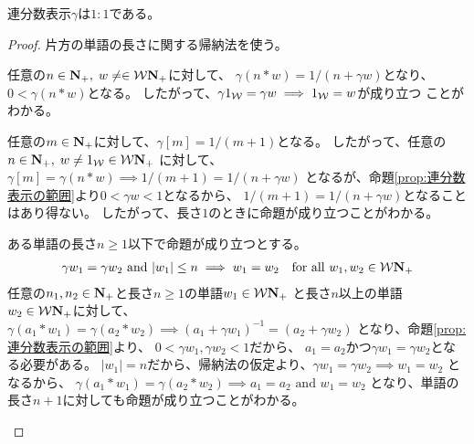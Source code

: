 	\begin{proposition}[連分数表示は1:1]\label{prop:連分数表示は1:1} %
		連分数表示$\gamma$は$1:1$である。
	\end{proposition} %
	\begin{proof} 片方の単語の長さに関する帰納法を使う。
	\begin{description}\setlength{\itemsep}{-1mm} %
		\item[長さ$0$] 任意の$n\in\mathbf{N}_+,\;w\neq\in{\ensuremath{{\mathcal{W}}}}\mathbf{N}_+$に対して、
		$\gamma(n*w)=1/(n+\gamma w)$となり、$0<\gamma(n*w)$となる。
		したがって、$\gamma1_{{\mathcal{W}}}=\gamma w \implies 1_{{\mathcal{W}}} = w$が成り立つ
		ことがわかる。
		\item[長さ$1$] 任意の$m\in\mathbf{N}_+$に対して、$\gamma[m]=1/(m+1)$となる。
		したがって、任意の$n\in\mathbf{N}_+,\;w\neq1_{{\mathcal{W}}}\in {\ensuremath{{\mathcal{W}}}}\mathbf{N}_+$
		に対して、$\gamma[m]=\gamma(n*w)\implies1/(m+1)=1/(n+\gamma w)$
		となるが、命題\ref{prop:連分数表示の範囲}より$0<\gamma w<1$となるから、
		$1/(m+1)=1/(n+\gamma w)$となることはあり得ない。
		したがって、長さ$1$のときに命題が成り立つことがわかる。
		\item[長さ$2$以上] ある単語の長さ$n\ge1$以下で命題が成り立つとする。
		\begin{equation*}\begin{split}
			\gamma w_1 = \gamma w_2 \text{ and }|w_1|\le n
			\implies w_1 = w_2
			\quad\text{for all }w_1,w_2\in{\ensuremath{{\mathcal{W}}}}\mathbf{N}_+
		\end{split}\end{equation*}
		任意の$n_1,n_2\in\mathbf{N}_+$と長さ$n\ge1$の単語$w_1\in {\ensuremath{{\mathcal{W}}}}\mathbf{N}_+$
		と長さ$n$以上の単語$w_2\in {\ensuremath{{\mathcal{W}}}}\mathbf{N}_+$に対して、
		$\gamma(a_1*w_1)=\gamma(a_2*w_2)\implies(a_1+\gamma w_1)^{-1}=(a_2+\gamma w_2)$
		となり、命題\ref{prop:連分数表示の範囲}より、
		$0<\gamma w_1,\gamma w_2<1$だから、
		$a_1=a_2$かつ$\gamma w_1=\gamma w_2$となる必要がある。
		$|w_1|=n$だから、帰納法の仮定より、$\gamma w_1=\gamma w_2\implies w_1=w_2$
		となるから、
		$\gamma(a_1*w_1)=\gamma(a_2*w_2)\implies a_1=a_2\text{ and }w_1=w_2$
		となり、単語の長さ$n+1$に対しても命題が成り立つことがわかる。
	\end{description} %
	\end{proof}

